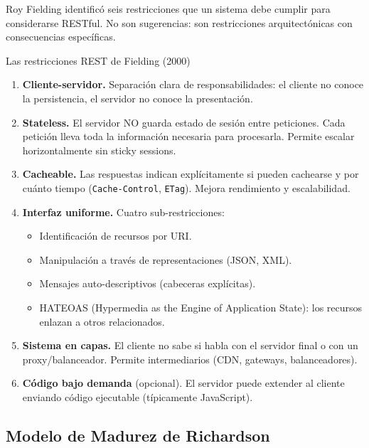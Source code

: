 Roy Fielding identificó seis restricciones que un sistema debe
cumplir para considerarse RESTful. No son sugerencias: son
restricciones arquitectónicas con consecuencias específicas.

\begin{cajadefinicion}{Las restricciones REST de Fielding (2000)}
\begin{enumerate}
\item \textbf{Cliente-servidor.} Separación clara de
responsabilidades: el cliente no conoce la persistencia, el servidor
no conoce la presentación.

\item \textbf{Stateless.} El servidor NO guarda estado de sesión
entre peticiones. Cada petición lleva toda la información necesaria
para procesarla. Permite escalar horizontalmente sin sticky sessions.

\item \textbf{Cacheable.} Las respuestas indican explícitamente si
pueden cachearse y por cuánto tiempo (\texttt{Cache-Control},
\texttt{ETag}). Mejora rendimiento y escalabilidad.

\item \textbf{Interfaz uniforme.} Cuatro sub-restricciones:
\begin{itemize}
\item Identificación de recursos por URI.
\item Manipulación a través de representaciones (JSON, XML).
\item Mensajes auto-descriptivos (cabeceras explícitas).
\item HATEOAS (Hypermedia as the Engine of Application State):
los recursos enlazan a otros relacionados.
\end{itemize}

\item \textbf{Sistema en capas.} El cliente no sabe si habla con el
servidor final o con un proxy/balanceador. Permite intermediarios
(CDN, gateways, balanceadores).

\item \textbf{Código bajo demanda} (opcional). El servidor puede
extender al cliente enviando código ejecutable (típicamente
JavaScript).
\end{enumerate}
\end{cajadefinicion}

\subsection{Modelo de Madurez de Richardson}

